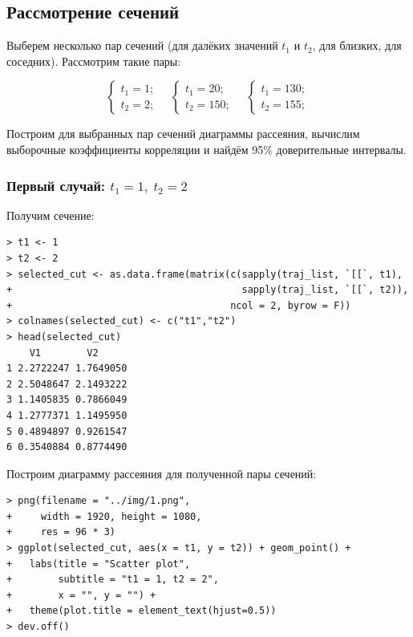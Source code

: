 \documentclass[14pt,a4paper]{scrartcl}
\begin{document}
\pagebreak

\subsection*{Рассмотрение сечений}
Выберем несколько пар сечений (для далёких значений $t_1$ и $t_2$, для близких, для соседних). Рассмотрим такие пары:

\begin{equation*}
		\begin{cases}
			t_1 = 1;\\
			t_2 = 2;
		\end{cases}
		\quad
		\begin{cases}
			t_1 = 20;\\
			t_2 = 150;
		\end{cases}
		\quad
		\begin{cases}
			t_1 = 130;\\
			t_2 = 155;
		\end{cases}
\end{equation*}

Построим для выбранных пар сечений диаграммы рассеяния, вычислим выборочные коэффициенты корреляции и найдём 95\% доверительные интервалы. \\
\subsubsection*{Первый случай: $t_1 = 1, \; t_2 = 2$}
Получим сечение:

\begin{verbatim}
> t1 <- 1
> t2 <- 2
> selected_cut <- as.data.frame(matrix(c(sapply(traj_list, `[[`, t1),
+                                        sapply(traj_list, `[[`, t2)),
+                                      ncol = 2, byrow = F))
> colnames(selected_cut) <- c("t1","t2")
> head(selected_cut)
	V1        V2
1 2.2722247 1.7649050
2 2.5048647 2.1493222
3 1.1405835 0.7866049
4 1.2777371 1.1495950
5 0.4894897 0.9261547
6 0.3540884 0.8774490
\end{verbatim}

Построим диаграмму рассеяния для полученной пары сечений:

\begin{verbatim}
> png(filename = "../img/1.png",
+     width = 1920, height = 1080,
+     res = 96 * 3)
> ggplot(selected_cut, aes(x = t1, y = t2)) + geom_point() +
+   labs(title = "Scatter plot",
+        subtitle = "t1 = 1, t2 = 2",
+        x = "", y = "") + 
+   theme(plot.title = element_text(hjust=0.5))
> dev.off()
\end{verbatim}
\end{document}
